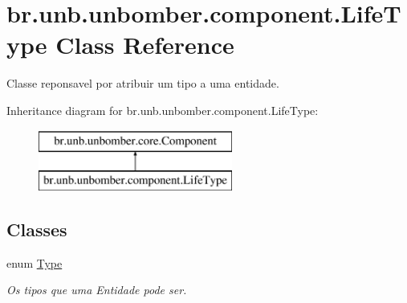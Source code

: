 \hypertarget{classbr_1_1unb_1_1unbomber_1_1component_1_1_life_type}{\section{br.\+unb.\+unbomber.\+component.\+Life\+Type Class Reference}
\label{classbr_1_1unb_1_1unbomber_1_1component_1_1_life_type}
}


Classe reponsavel por atribuir um tipo a uma entidade.  


Inheritance diagram for br.\+unb.\+unbomber.\+component.\+Life\+Type\+:\begin{figure}[H]
\begin{center}
\leavevmode
\includegraphics[height=2.000000cm]{classbr_1_1unb_1_1unbomber_1_1component_1_1_life_type}
\end{center}
\end{figure}
\subsection*{Classes}
\begin{DoxyCompactItemize}
\item 
enum \hyperlink{enumbr_1_1unb_1_1unbomber_1_1component_1_1_life_type_1_1_type}{Type}
\begin{DoxyCompactList}\small\item\em Os tipos que uma Entidade pode ser. \end{DoxyCompactList}\end{DoxyCompactItemize}
